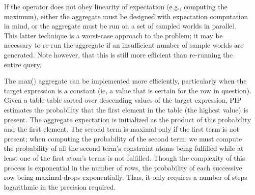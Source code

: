 If the operator does not obey linearity of expectation (e.g., computing the maximum), either the aggregate must be designed with expectation computation in mind, or the aggregate must be run on a set of sampled worlds in parallel.  This latter technique is a worst-case approach to the problem; it may be necessary to re-run the aggregate if an insufficient number of sample worlds are generated. Note however, that this is still more efficient than re-running the entire query.

The max() aggregate can be implemented more efficiently, particularly when the target expression is a constant (ie, a value that is certain for the row in question).  Given a table table sorted over descending values of the target expression, PIP estimates the probability that the first element in the table (the highest value) is present.  The aggregate expectation is initialized as the product of this probability and the first element.  The second term is maximal only if the first term is not present; when computing the probability of the second term, we must compute the probability of all the second term's constraint atoms being fulfilled while at least one of the first atom's terms is not fulfilled.  Though the complexity of this process is exponential in the number of rows, the probability of each successive row being maximal drops exponentially.  Thus, it only requires a number of steps logarithmic in the precision required.




